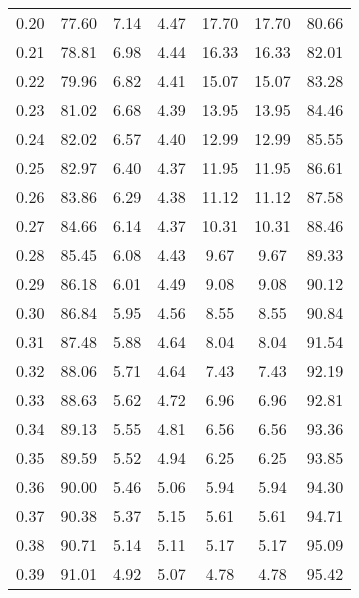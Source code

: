 \begin{tabular}{|c|c|c|c|c|c|c|}
      0.20 &     77.60 &      7.14 &       4.47 &   17.70 &      17.70 &         80.66 \\
      0.21 &     78.81 &      6.98 &       4.44 &   16.33 &      16.33 &         82.01 \\
      0.22 &     79.96 &      6.82 &       4.41 &   15.07 &      15.07 &         83.28 \\
      0.23 &     81.02 &      6.68 &       4.39 &   13.95 &      13.95 &         84.46 \\
      0.24 &     82.02 &      6.57 &       4.40 &   12.99 &      12.99 &         85.55 \\
      0.25 &     82.97 &      6.40 &       4.37 &   11.95 &      11.95 &         86.61 \\
      0.26 &     83.86 &      6.29 &       4.38 &   11.12 &      11.12 &         87.58 \\
      0.27 &     84.66 &      6.14 &       4.37 &   10.31 &      10.31 &         88.46 \\
      0.28 &     85.45 &      6.08 &       4.43 &    9.67 &       9.67 &         89.33 \\
      0.29 &     86.18 &      6.01 &       4.49 &    9.08 &       9.08 &         90.12 \\
      0.30 &     86.84 &      5.95 &       4.56 &    8.55 &       8.55 &         90.84 \\
      0.31 &     87.48 &      5.88 &       4.64 &    8.04 &       8.04 &         91.54 \\
      0.32 &     88.06 &      5.71 &       4.64 &    7.43 &       7.43 &         92.19 \\
      0.33 &     88.63 &      5.62 &       4.72 &    6.96 &       6.96 &         92.81 \\
      0.34 &     89.13 &      5.55 &       4.81 &    6.56 &       6.56 &         93.36 \\
      0.35 &     89.59 &      5.52 &       4.94 &    6.25 &       6.25 &         93.85 \\
      0.36 &     90.00 &      5.46 &       5.06 &    5.94 &       5.94 &         94.30 \\
      0.37 &     90.38 &      5.37 &       5.15 &    5.61 &       5.61 &         94.71 \\
      0.38 &     90.71 &      5.14 &       5.11 &    5.17 &       5.17 &         95.09 \\
      0.39 &     91.01 &      4.92 &       5.07 &    4.78 &       4.78 &         95.42 \\

\end{tabular}
